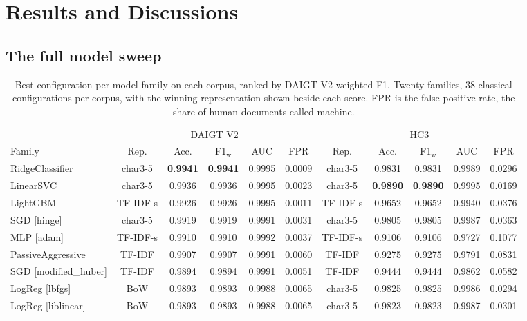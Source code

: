 \documentclass[conference,a4paper]{IEEEtran}
\begin{document}
\section{Results and Discussions}
\label{sec:results}

\subsection{The full model sweep}
\label{sec:sweep}

\begin{table}[!t]
\centering
\caption{Best configuration per model family on each corpus, ranked by DAIGT V2 weighted F1. Twenty families, 38 classical configurations per corpus, with the winning representation shown beside each score. FPR is the false-positive rate, the share of human documents called machine.}
\label{tab:families}
\footnotesize
\setlength{\tabcolsep}{4pt}
\begin{tabular}{@{}lccccc@{\hspace{10pt}}ccccc@{}}
\toprule
& \multicolumn{5}{c}{DAIGT V2} & \multicolumn{5}{c}{HC3} \\
\cmidrule(lr){2-6}\cmidrule(lr){7-11}
Family & Rep. & Acc. & F1$_\mathrm{w}$ & AUC & FPR & Rep. & Acc. & F1$_\mathrm{w}$ & AUC & FPR \\
\midrule
RidgeClassifier & char3-5 & \textbf{0.9941} & \textbf{0.9941} & 0.9995 & 0.0009 & char3-5 & 0.9831 & 0.9831 & 0.9989 & 0.0296 \\
LinearSVC & char3-5 & 0.9936 & 0.9936 & 0.9995 & 0.0023 & char3-5 & \textbf{0.9890} & \textbf{0.9890} & 0.9995 & 0.0169 \\
LightGBM & TF-IDF-s & 0.9926 & 0.9926 & 0.9995 & 0.0011 & TF-IDF-s & 0.9652 & 0.9652 & 0.9940 & 0.0376 \\
SGD [hinge] & char3-5 & 0.9919 & 0.9919 & 0.9991 & 0.0031 & char3-5 & 0.9805 & 0.9805 & 0.9987 & 0.0363 \\
MLP [adam] & TF-IDF-s & 0.9910 & 0.9910 & 0.9992 & 0.0037 & TF-IDF-s & 0.9106 & 0.9106 & 0.9727 & 0.1077 \\
PassiveAggressive & TF-IDF & 0.9907 & 0.9907 & 0.9991 & 0.0060 & TF-IDF & 0.9275 & 0.9275 & 0.9791 & 0.0831 \\
SGD [modified\_huber] & TF-IDF & 0.9894 & 0.9894 & 0.9991 & 0.0051 & TF-IDF & 0.9444 & 0.9444 & 0.9862 & 0.0582 \\
LogReg [lbfgs] & BoW & 0.9893 & 0.9893 & 0.9988 & 0.0065 & char3-5 & 0.9825 & 0.9825 & 0.9986 & 0.0294 \\
LogReg [liblinear] & BoW & 0.9893 & 0.9893 & 0.9988 & 0.0065 & char3-5 & 0.9823 & 0.9823 & 0.9987 & 0.0301 \\

\end{tabular}
\end{table}
\end{document}
